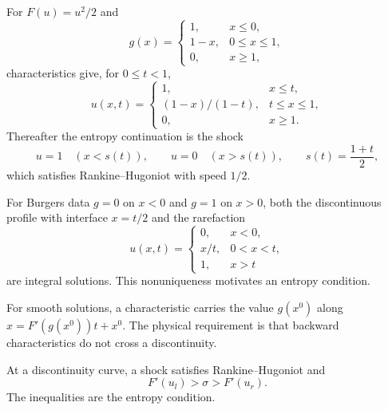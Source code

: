 \begin{example}
\label{ex:burgers-shock-formation}

For $F(u)=u^2/2$ and
\[
g(x)=\begin{cases}1,&x\le0,\\1-x,&0\le x\le1,\\0,&x\ge1,\end{cases}
\]
characteristics give, for $0\le t<1$,
\[
u(x,t)=\begin{cases}
1,&x\le t,\\
(1-x)/(1-t),&t\le x\le1,\\
0,&x\ge1.
\end{cases}
\]
Thereafter the entropy continuation is the shock
\[
u=1\quad(x<s(t)),\qquad u=0\quad(x>s(t)),\qquad s(t)=\frac{1+t}{2},
\]
which satisfies Rankine--Hugoniot with speed $1/2$.
\end{example}

\begin{example}
\label{ex:rarefaction-nonphysical-shock}

For Burgers data $g=0$ on $x<0$ and $g=1$ on $x>0$, both the discontinuous
profile with interface $x=t/2$ and the rarefaction
\[
u(x,t)=\begin{cases}0,&x<0,\\x/t,&0<x<t,\\1,&x>t\end{cases}
\]
are integral solutions. This nonuniqueness motivates an entropy condition.
\end{example}

For smooth solutions, a characteristic carries the value $g(x^0)$ along
$x=F'(g(x^0))t+x^0$. The physical requirement is that backward
characteristics do not cross a discontinuity.

\begin{definition}
\label{def:shock-entropy-condition}

At a discontinuity curve, a shock satisfies Rankine--Hugoniot and
\[
F'(u_l)>\sigma>F'(u_r).
\]
The inequalities are the entropy condition.
\end{definition}

